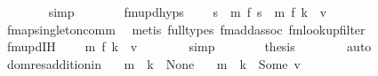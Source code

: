 \begin{isabellebody}
\ \ \ \ \ \ \isamarkupfalse%
\ simp\isanewline
\ \ \ \ \isamarkupfalse%
\ \isamarkupfalse%
\ fmupd{\isachardot}{\kern0pt}hyps\ \isamarkupfalse%
\ {\isachardoublequoteopen}{\isasymdots}\ {\isacharequal}{\kern0pt}\ s\ {\isasymlhd}{\isacharslash}{\kern0pt}\ m\ {\isacharplus}{\kern0pt}{\isacharplus}{\kern0pt}\isactrlsub f\ s\ {\isasymlhd}\ m\ {\isacharplus}{\kern0pt}{\isacharplus}{\kern0pt}\isactrlsub f\ {\isacharbraceleft}{\kern0pt}k\ {\isachardollar}{\kern0pt}{\isachardollar}{\kern0pt}{\isacharcolon}{\kern0pt}{\isacharequal}{\kern0pt}\ v{\isacharbraceright}{\kern0pt}{\isachardoublequoteclose}\isanewline
\ \ \ \ \ \ \isamarkupfalse%
\ fmap{\isacharunderscore}{\kern0pt}singleton{\isacharunderscore}{\kern0pt}comm\ \isamarkupfalse%
\ {\isacharparenleft}{\kern0pt}metis\ {\isacharparenleft}{\kern0pt}full{\isacharunderscore}{\kern0pt}types{\isacharparenright}{\kern0pt}\ fmadd{\isacharunderscore}{\kern0pt}assoc\ fmlookup{\isacharunderscore}{\kern0pt}filter{\isacharparenright}{\kern0pt}\isanewline
\ \ \ \ \isamarkupfalse%
\ \isamarkupfalse%
\ fmupd{\isachardot}{\kern0pt}IH\ \isamarkupfalse%
\ {\isachardoublequoteopen}{\isasymdots}\ {\isacharequal}{\kern0pt}\ m\ {\isacharplus}{\kern0pt}{\isacharplus}{\kern0pt}\isactrlsub f\ {\isacharbraceleft}{\kern0pt}k\ {\isachardollar}{\kern0pt}{\isachardollar}{\kern0pt}{\isacharcolon}{\kern0pt}{\isacharequal}{\kern0pt}\ v{\isacharbraceright}{\kern0pt}{\isachardoublequoteclose}\isanewline
\ \ \ \ \ \ \isamarkupfalse%
\ simp\isanewline
\ \ \ \ \isamarkupfalse%
\ \isamarkupfalse%
\ {\isacharquery}{\kern0pt}thesis\isanewline
\ \ \ \ \ \ \isamarkupfalse%
\ auto\isanewline
\ \ \isamarkupfalse%
\isanewline
{}\isamarkupfalse%
%
\endisatagproof
{\isafoldproof}%
%
\isadelimproof
\isanewline
%
\endisadelimproof
\isanewline
{}\isamarkupfalse%
\ dom{\isacharunderscore}{\kern0pt}res{\isacharunderscore}{\kern0pt}addition{\isacharunderscore}{\kern0pt}in{\isacharcolon}{\kern0pt}\isanewline
\ \ \ {\isachardoublequoteopen}m\ {\isachardollar}{\kern0pt}{\isachardollar}{\kern0pt}\ k\ {\isacharequal}{\kern0pt}\ None{\isachardoublequoteclose}\isanewline
\ \ \ {\isachardoublequoteopen}m\ {\isachardollar}{\kern0pt}{\isachardollar}{\kern0pt}\ k\ {\isacharequal}{\kern0pt}\ Some\ v{\isacharprime}{\kern0pt}{\isachardoublequoteclose}\isanewline

\end{isabellebody}
